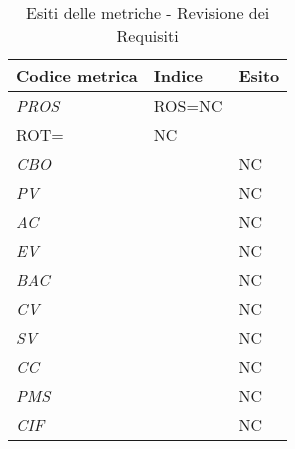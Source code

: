 	
		
	\begin{longtable}{ >{\centering}p{} >{\centering}p{}
			 >{\centering}p{}}
		\caption{Esiti delle metriche - Revisione dei Requisiti} \\
		\rowcolorhead
		\centering\textbf{\color{white}Codice metrica} 
		& \centering\textbf{\color{white}Indice} 
		& \centering\textbf{\color{white}Esito}
		\tabularnewline %
		\endfirsthead
		
		\textit{PROS} & ROS=NC \\ ROT= & NC
		\tabularnewline 
		
		\textit{CBO} &   & NC
		\tabularnewline
		
		\textit{PV} &   & NC
		\tabularnewline
		
		\textit{AC} &   & NC
		\tabularnewline
		
		\textit{EV} &   & NC
		\tabularnewline
		
		\textit{BAC} &   & NC
		\tabularnewline
		
		\textit{CV} &   & NC
		\tabularnewline
		
		\textit{SV} &   & NC
		\tabularnewline
		
		\textit{CC} &   & NC
		\tabularnewline
		
		\textit{PMS} &   & NC
		\tabularnewline
		
		\textit{CIF} &   & NC
		\tabularnewline
	\end{longtable}